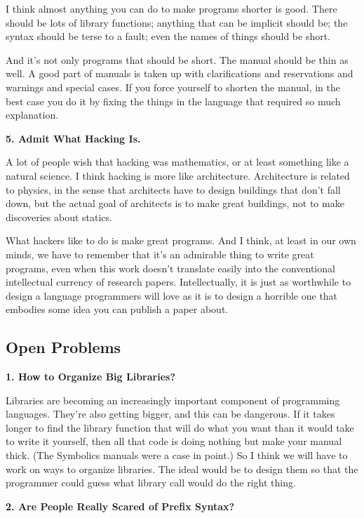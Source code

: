 I think almost anything you can do to make programs shorter is good.
There should be lots of library functions; anything that can be implicit
should be; the syntax should be terse to a fault; even the names of
things should be short.

And it's not only programs that should be short. The manual should be
thin as well. A good part of manuals is taken up with clarifications and
reservations and warnings and special cases. If you force yourself to
shorten the manual, in the best case you do it by fixing the things in
the language that required so much explanation.

\textbf{5. Admit What Hacking Is.}

A lot of people wish that hacking was mathematics, or at least something
like a natural science. I think hacking is more like architecture.
Architecture is related to physics, in the sense that architects have to
design buildings that don't fall down, but the actual goal of architects
is to make great buildings, not to make discoveries about statics.

What hackers like to do is make great programs. And I think, at least in
our own minds, we have to remember that it's an admirable thing to write
great programs, even when this work doesn't translate easily into the
conventional intellectual currency of research papers. Intellectually,
it is just as worthwhile to design a language programmers will love as
it is to design a horrible one that embodies some idea you can publish a
paper about.

\subsection{Open Problems}\label{open-problems}

\textbf{1. How to Organize Big Libraries?}

Libraries are becoming an increasingly important component of
programming languages. They're also getting bigger, and this can be
dangerous. If it takes longer to find the library function that will do
what you want than it would take to write it yourself, then all that
code is doing nothing but make your manual thick. (The Symbolics manuals
were a case in point.) So I think we will have to work on ways to
organize libraries. The ideal would be to design them so that the
programmer could guess what library call would do the right thing.

\textbf{2. Are People Really Scared of Prefix Syntax?}


